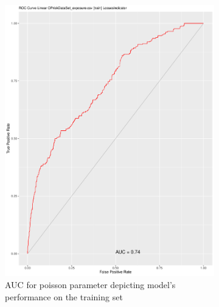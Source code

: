 \documentclass[
]{article}
\begin{document}
\begin{figure}[t!] %
\begin{subfigure}{0.48\textwidth}
\includegraphics[width=\linewidth]{POI_ROC_Training.pdf}
\caption{AUC for poisson parameter depicting model's performance on the training set} \label{POI_ROC_Train}
\end{subfigure}\hspace*{\fill}
\begin{subfigure}{0.48\textwidth}

\end{subfigure}
\end{figure}
\end{document}
